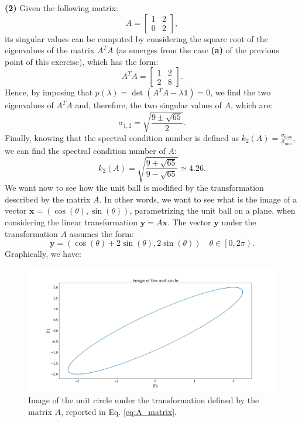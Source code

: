 \documentclass[a4paper,11pt]{article}
\begin{document}
\noindent \textbf{(2)} Given the following matrix:
\begin{equation}\label{eq:A_matrix}
	A = \begin{bmatrix}
		1 & 2 \\
		0 & 2
	\end{bmatrix},
\end{equation}
its singular values can be computed by considering the square root of the eigenvalues of the matrix $A^{T}A$ (as emerges from the case \textbf{(a)} of the previous point of this exercise), which has the form:
\begin{equation}
	A^{T}A = \begin{bmatrix}
		1 & 2 \\
		2 & 8
	\end{bmatrix}.
\end{equation}
Hence, by imposing that $p(\lambda)=\det(A^{T}A -\lambda\mathbb{1})=0$, we find the two eigenvalues of $A^{T}A$ and, therefore, the two singular values of $A$, which are:
\begin{equation}
	\sigma_{1,2}=\sqrt{\frac{9 \pm \sqrt{65}}{2}}.
\end{equation}
Finally, knowing that the spectral condition number is defined as $k_{2}(A) = \frac{\sigma_{\max}}{\sigma_{\min}}$, we can find the spectral condition number of $A$:
\begin{equation}
	k_{2}(A) = \sqrt{\frac{9+\sqrt{65}}{9-\sqrt{65}}} \simeq 4.26.
\end{equation}
We want now to see how the unit ball is modified by the transformation described by the matrix $A$. In other words, we want to see what is the image of a vector $\textbf{x}=(\cos(\theta),\sin(\theta))$, parametrizing the unit ball on a plane, when considering the linear transformation $\textbf{y}=A\textbf{x}$. The vector $\textbf{y}$ under the transformation $A$ assumes the form:
\[\textbf{y}=(\cos(\theta) + 2\sin(\theta), 2\sin(\theta)) \quad \theta \in \left[0,2\pi\right).\]
Graphically, we have:
\begin{figure}[H]
	\centering
	\includegraphics[scale=0.25]{Plot/Image_unit_circle}
	\caption{Image of the unit circle under the transformation defined by the matrix $A$, reported in Eq. \eqref{eq:A_matrix}.}
	\label{fig:Image_unit_circle}
\end{figure}
\end{document}
